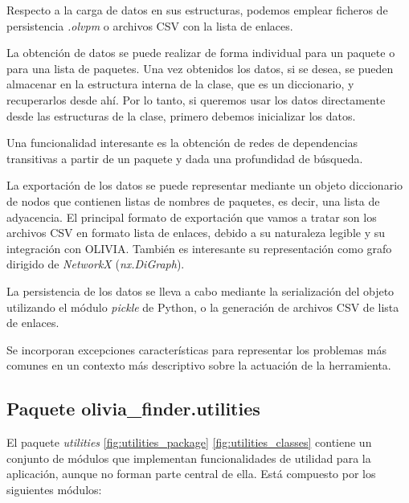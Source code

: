 Respecto a la carga de datos en sus estructuras, podemos emplear ficheros de
persistencia \textit{.olvpm} o archivos CSV con la lista de enlaces.

La obtención de datos se puede realizar de forma individual para un paquete o para una lista de
paquetes. Una vez obtenidos los datos, si se desea, se pueden almacenar en la estructura interna
de la clase, que es un diccionario, y recuperarlos desde ahí. Por lo tanto, si queremos usar los
datos directamente desde las estructuras de la clase, primero debemos inicializar los datos.

Una funcionalidad interesante es la obtención de redes de dependencias transitivas a partir de un
paquete y dada una profundidad de búsqueda.

La exportación de los datos se puede representar mediante un objeto diccionario de nodos que
contienen listas de nombres de paquetes, es decir, una lista de adyacencia. El principal formato
de exportación que vamos a tratar son los archivos CSV en formato lista de enlaces, debido a su
naturaleza legible y su integración con OLIVIA. También es interesante su representación como
grafo dirigido de \textit{NetworkX} (\textit{nx.DiGraph}).

La persistencia de los datos se lleva a cabo mediante la serialización del objeto utilizando el
módulo \textit{pickle} de Python, o la generación de archivos CSV de lista de enlaces.

Se incorporan excepciones características para representar los problemas más comunes en un contexto
más descriptivo sobre la actuación de la herramienta.

\subsection{Paquete olivia\_finder.utilities}

El paquete \textit{utilities} \ref{fig:utilities_package} \ref{fig:utilities_classes} contiene un conjunto de módulos que implementan funcionalidades de
utilidad para la aplicación, aunque no forman parte central de ella. Está compuesto por los siguientes módulos:

